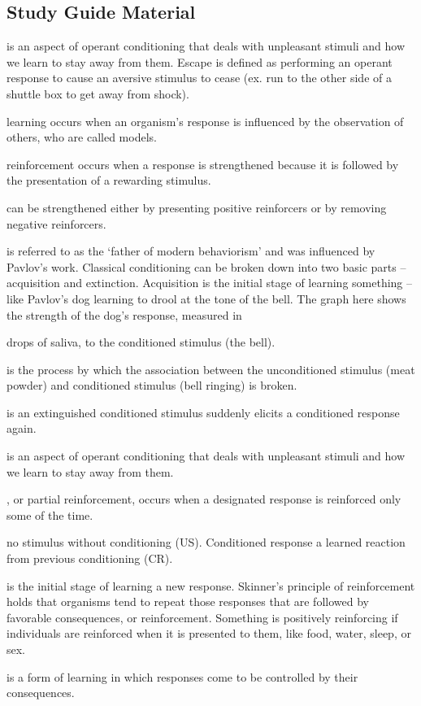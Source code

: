 \documentclass{article}
\begin{document}
\subsection{Study Guide Material}
\begin{description}
    \item [Aversive conditioning] is an aspect of operant conditioning that deals with unpleasant stimuli and how we learn to stay away from them.
    Escape is defined as performing an operant response to cause an aversive stimulus to cease (ex. run to the other side of a shuttle box to get away from shock).
    \item [Observational] learning occurs when an organism’s response is influenced by the observation of others, who are called models.
    \item [Positive] reinforcement occurs when a response is strengthened because it is followed by the presentation of a rewarding stimulus.
    \item [Responses] can be strengthened either by presenting positive reinforcers or by removing negative reinforcers.
    \item [John Watson] is referred to as the ‘father of modern behaviorism’ and was influenced by Pavlov’s work.
    Classical conditioning can be broken down into two basic parts – acquisition and extinction.  Acquisition is the initial stage of learning something – like Pavlov’s dog learning to drool at the tone of the bell. The graph here shows the strength of the dog’s response, measured in \item drops of saliva, to the conditioned stimulus (the bell).
    \item [Extinction] is the process by which the association between the unconditioned stimulus (meat powder) and conditioned stimulus (bell ringing) is broken.
    \item [Spontaneous recovery] is an extinguished conditioned stimulus suddenly elicits a conditioned response again.
    \item [Aversive conditioning] is an aspect of operant conditioning that deals with unpleasant stimuli and how we learn to stay away from them.
    \item [Intermittent reinforcement], or partial reinforcement, occurs when a designated response is reinforced only some of the time.
    \item [Unconditioned stimulus] no stimulus without conditioning (US). Conditioned response  a learned reaction from previous conditioning (CR).
    \item [Acquisition] is the initial stage of learning a new response.
    Skinner’s principle of reinforcement holds that organisms tend to repeat those responses that are followed by favorable consequences, or reinforcement. Something is positively reinforcing if individuals are reinforced when it is presented to them, like food, water, sleep, or sex.
    \item [Operant conditioning] is a form of learning in which responses come to be controlled by their consequences.
\end{description}
\end{document}
